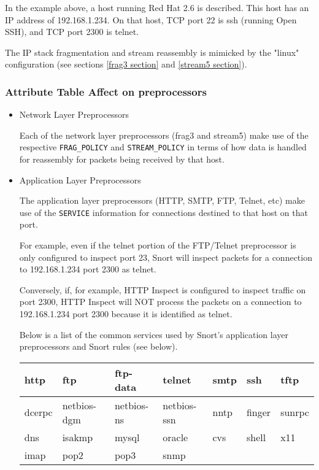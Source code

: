 \documentclass[english]{report}
\begin{document}
In the example above, a host running Red Hat 2.6 is described. This host has
an IP address of 192.168.1.234.  On that host, TCP port 22 is ssh (running
Open SSH), and TCP port 2300 is telnet.

The IP stack fragmentation and stream reassembly is mimicked by the "linux"
configuration (see sections \ref{frag3 section} and \ref{stream5 section}).

\subsubsection{Attribute Table Affect on preprocessors}

\begin{itemize}
\item{Network Layer Preprocessors}

Each of the network layer preprocessors (frag3 and stream5) make use of the
respective \texttt{FRAG\_POLICY} and \texttt{STREAM\_POLICY} in terms of
how data is handled for reassembly for packets being received by that host.

\item{Application Layer Preprocessors}

The application layer preprocessors (HTTP, SMTP, FTP, Telnet, etc) make
use of the \texttt{SERVICE} information for connections destined to that
host on that port.  

For example, even if the telnet portion of the FTP/Telnet preprocessor is
only configured to inspect port 23, Snort will inspect packets for a connection
to 192.168.1.234 port 2300 as telnet.

Conversely, if, for example, HTTP Inspect is configured to inspect traffic
on port 2300, HTTP Inspect will NOT process the packets on a connection
to 192.168.1.234 port 2300 because it is identified as telnet.

Below is a list of the common services used by Snort's application layer
preprocessors and Snort rules (see below).

\begin{table}[h]
\label{attribute:service names}
\begin{center}
\begin{tabular}{| l | l | l | l | l | l | l |}
\hline 
http & ftp & ftp-data & telnet & smtp & ssh & tftp \\
\hline 
dcerpc & netbios-dgm & netbios-ns & netbios-ssn & nntp & finger & sunrpc \\
\hline 
dns & isakmp & mysql & oracle & cvs & shell & x11 \\
\hline 
imap & pop2 & pop3 & snmp & & & \\
\hline 
\end{tabular}
\end{center}
\end{table}
\end{itemize}
\end{document}
